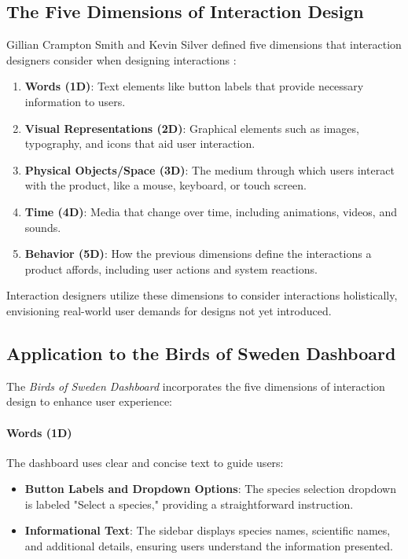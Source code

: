 \subsection{The Five Dimensions of Interaction Design}

Gillian Crampton Smith and Kevin Silver defined five dimensions that interaction designers consider when designing interactions \cite{WhatInteractionDesign2024}:

\begin{enumerate} 
    \item \textbf{Words (1D)}: Text elements like button labels that provide necessary information to users. 
    \item \textbf{Visual Representations (2D)}: Graphical elements such as images, typography, and icons that aid user interaction. 
    \item \textbf{Physical Objects/Space (3D)}: The medium through which users interact with the product, like a mouse, keyboard, or touch screen. 
    \item \textbf{Time (4D)}: Media that change over time, including animations, videos, and sounds. 
    \item \textbf{Behavior (5D)}: How the previous dimensions define the interactions a product affords, including user actions and system reactions. 
\end{enumerate}

Interaction designers utilize these dimensions to consider interactions holistically, envisioning real-world user demands for designs not yet introduced.

\subsection{Application to the Birds of Sweden Dashboard}

The \textit{Birds of Sweden Dashboard} incorporates the five dimensions of interaction design to enhance user experience:

\paragraph{Words (1D)}

The dashboard uses clear and concise text to guide users:

\begin{itemize} 
    \item \textbf{Button Labels and Dropdown Options}: The species selection dropdown is labeled "Select a species," providing a straightforward instruction. 
    \item \textbf{Informational Text}: The sidebar displays species names, scientific names, and additional details, ensuring users understand the information presented. 
\end{itemize}

